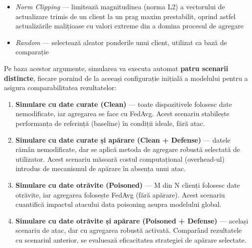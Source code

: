 \documentclass[../../main.tex]{subfiles}
\begin{document}
\begin{itemize}
\begin{itemize}
            \item \textit{Norm Clipping} --- limitează magnitudinea (norma L2) a vectorului de actualizare trimis de un client la un prag maxim prestabilit, oprind astfel actualizările malițioase cu valori extreme din a domina procesul de agregare
            \item \textit{Random} --- selectează aleator ponderile unui client, utilizat ca bază de comparație
        \end{itemize}
    \end{itemize}

    Pe baza acestor argumente, simularea va executa automat \textbf{patru scenarii distincte}, fiecare pornind de la aceeași configurație inițială a modelului pentru a asigura comparabilitatea rezultatelor:

    \begin{enumerate}
        \item \textbf{Simulare cu date curate (Clean)} --- toate dispozitivele folosesc date nemodificate, iar agregarea se face cu FedAvg. Acest scenariu stabilește performanța de referință (baseline) în condiții ideale, fără atac.
        \item \textbf{Simulare cu date curate și apărare (Clean + Defense)} --- datele rămân nemodificate, dar se aplică metoda de agregare robustă selectată de utilizator. Acest scenariu măsoară costul computațional (overhead-ul) introdus de mecanismul de apărare în absența unui atac.
        \item \textbf{Simulare cu date otrăvite (Poisoned)} --- M din N clienți folosesc date otrăvite, iar agregarea folosește FedAvg (fără apărare). Acest scenariu cuantifică impactul atacului data poisoning asupra modelului global.
        \item \textbf{Simulare cu date otrăvite și apărare (Poisoned + Defense)} --- același scenariu de atac, dar cu agregarea robustă activată. Comparând rezultatele cu scenariul anterior, se evaluează eficacitatea strategiei de apărare selectate.
    \end{enumerate}
\end{document}
